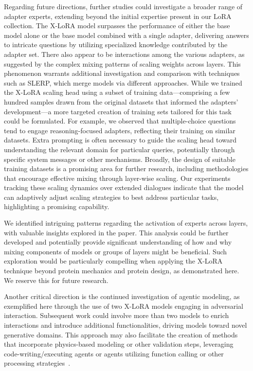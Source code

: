Regarding future directions, further studies could investigate a broader range of adapter experts, extending beyond the initial expertise present in our LoRA collection. The X-LoRA model surpasses the performance of either the base model alone or the base model combined with a single adapter, delivering answers to intricate questions by utilizing specialized knowledge contributed by the adapter set. There also appear to be interactions among the various adapters, as suggested by the complex mixing patterns of scaling weights across layers. This phenomenon warrants additional investigation and comparison with techniques such as SLERP, which merge models via different approaches. While we trained the X-LoRA scaling head using a subset of training data—comprising a few hundred samples drawn from the original datasets that informed the adapters’ development—a more targeted creation of training sets tailored for this task could be formulated. For example, we observed that multiple-choice questions tend to engage reasoning-focused adapters, reflecting their training on similar datasets. Extra prompting is often necessary to guide the scaling head toward understanding the relevant domain for particular queries, potentially through specific system messages or other mechanisms. Broadly, the design of suitable training datasets is a promising area for further research, including methodologies that encourage effective mixing through layer-wise scaling. Our experiments tracking these scaling dynamics over extended dialogues indicate that the model can adaptively adjust scaling strategies to best address particular tasks, highlighting a promising capability.

We identified intriguing patterns regarding the activation of experts across layers, with valuable insights explored in the paper. This analysis could be further developed and potentially provide significant understanding of how and why mixing components of models or groups of layers might be beneficial. Such exploration would be particularly compelling when applying the X-LoRA technique beyond protein mechanics and protein design, as demonstrated here. We reserve this for future research.

Another critical direction is the continued investigation of agentic modeling, as exemplified here through the use of two X-LoRA models engaging in adversarial interaction. Subsequent work could involve more than two models to enrich interactions and introduce additional functionalities, driving models toward novel generative domains. This approach may also facilitate the creation of methods that incorporate physics-based modeling or other validation steps, leveraging code-writing/executing agents or agents utilizing function calling or other processing strategies~\cite{Ghafarollahi2024ProtAgents:Learning}.

